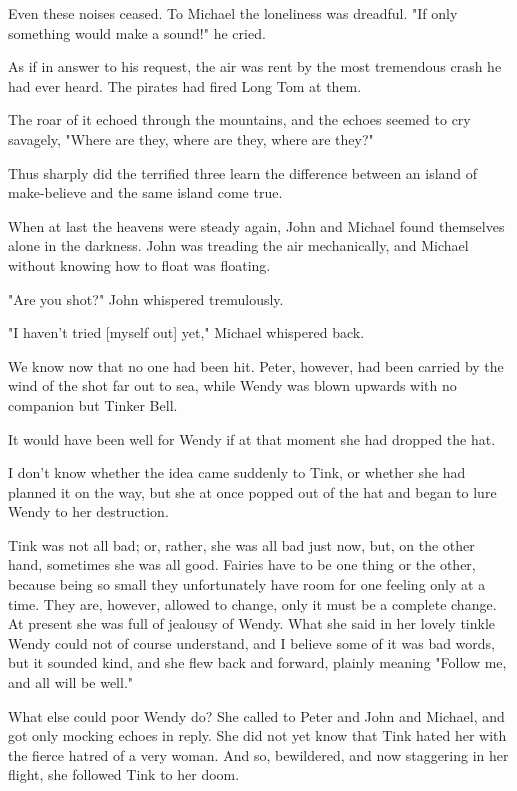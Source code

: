Even these noises ceased. To Michael the loneliness was dreadful. "If only
something would make a sound!" he cried.


As if in answer to his request, the air was rent by the most tremendous
crash he had ever heard. The pirates had fired Long Tom at them.


The roar of it echoed through the mountains, and the echoes seemed to cry
savagely, "Where are they, where are they, where are they?"


Thus sharply did the terrified three learn the difference between an
island of make-believe and the same island come true.


When at last the heavens were steady again, John and Michael found
themselves alone in the darkness. John was treading the air mechanically,
and Michael without knowing how to float was floating.


"Are you shot?" John whispered tremulously.


"I haven't tried [myself out] yet," Michael whispered back.


We know now that no one had been hit. Peter, however, had been carried by
the wind of the shot far out to sea, while Wendy was blown upwards with no
companion but Tinker Bell.


It would have been well for Wendy if at that moment she had dropped the
hat.


I don't know whether the idea came suddenly to Tink, or whether she had
planned it on the way, but she at once popped out of the hat and began to
lure Wendy to her destruction.


Tink was not all bad; or, rather, she was all bad just now, but, on the
other hand, sometimes she was all good. Fairies have to be one thing or
the other, because being so small they unfortunately have room for one
feeling only at a time. They are, however, allowed to change, only it must
be a complete change. At present she was full of jealousy of Wendy. What
she said in her lovely tinkle Wendy could not of course understand, and I
believe some of it was bad words, but it sounded kind, and she flew back
and forward, plainly meaning "Follow me, and all will be well."


What else could poor Wendy do? She called to Peter and John and Michael,
and got only mocking echoes in reply. She did not yet know that Tink hated
her with the fierce hatred of a very woman. And so, bewildered, and now
staggering in her flight, she followed Tink to her doom.

